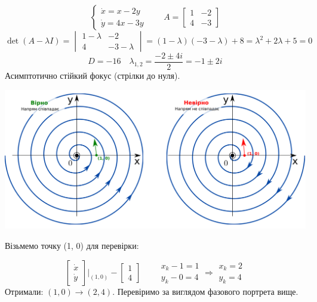 \begin{example}
    $$
    \begin{cases}
        \dot{x } = x - 2y\\
        \dot{y} = 4x - 3y
    \end{cases} \qquad A = \begin{bmatrix}
     1 & -2 \\
     4 & -3
    \end{bmatrix}
    $$
    $$ \det{(A - \lambda I)} = \begin{vmatrix}
      1- \lambda & -2 \\
      4 & -3-\lambda
    \end{vmatrix}  = ( 1- \lambda) (-3 - \lambda) + 8 = \lambda^2 + 2 \lambda + 5 = 0$$
$$
D = -16 \quad \lambda_{1,2} = \frac{-2 \pm 4i}{2} = -1 \pm 2i
$$
Асимптотично стійкий фокус (стрілки до нуля).
\begin{center} \includegraphics[scale=0.3]{assets/lectures_recent-b90426e3.png} \end{center}
Візьмемо точку (1, 0) для перевірки:

$$
\begin{bmatrix}
 \dot{x}\\
 \dot{y}
\end{bmatrix}\Bigg|_{(1,0)} - \begin{bmatrix}
 1 \\
 4
\end{bmatrix} \qquad \begin{gathered}
 x_k -1 = 1 \\
 y_k - 0 = 4
\end{gathered} \Rightarrow \begin{gathered}
 x_k = 2 \\
 y_k  = 4
\end{gathered}
$$
Отримали: $(1,0) \to (2, 4)$. Перевіримо за виглядом фазового портрета вище.
\end{example}

